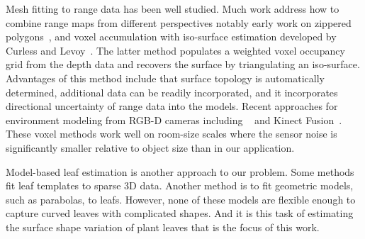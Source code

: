 Mesh fitting to range data has been well studied.  Much work address how to combine range maps from different perspectives notably early work on zippered polygons~\cite{Turk1994}, and voxel accumulation with iso-surface estimation developed by Curless and Levoy~\cite{Curless:1996}.  The latter method populates a weighted voxel occupancy grid from the depth data and recovers the surface by triangulating an iso-surface.  Advantages of this method include that surface topology is automatically determined, additional data can be readily incorporated, and it incorporates directional uncertainty of range data into the models.  Recent approaches for environment modeling from RGB-D cameras including ~\cite{Xu2011} and Kinect Fusion~\cite{Izadi:2011,Newcombe:2011}.  These voxel methods work well on room-size scales where the sensor noise is significantly smaller relative to object size than in our application.

Model-based leaf estimation is another approach to our problem.  Some methods~\cite{Quan:2006,Bradley:2013} fit leaf templates to sparse $3$D data.  Another method is to fit geometric models, such as parabolas, to leafs\cite{Alenya2011,Alenya2013}.  However, none of these models are flexible enough to capture curved leaves with complicated shapes.  And it is this task of estimating the surface shape variation of plant leaves that is the focus of this work.


